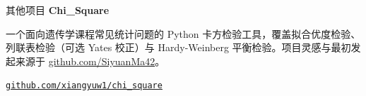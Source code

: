 \begin{rubric}{其他项目}
\entry*[]
\textbf{Chi\_Square}\par
	一个面向遗传学课程常见统计问题的 Python 卡方检验工具，覆盖拟合优度检验、列联表检验（可选 Yates 校正）与 Hardy-Weinberg 平衡检验。项目灵感与最初发起来源于 \href{https://github.com/SiyuanMa42/}{github.com/SiyuanMa42}。\par
	\href{https://github.com/xiangyuw1/chi_square}{\texttt{github.com/xiangyuw1/chi\_square}}\par
\end{rubric}
